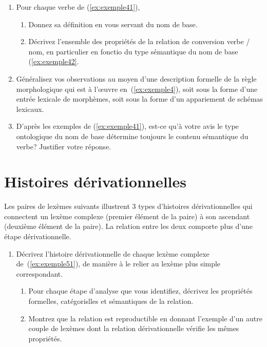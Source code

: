 \begin{enumerate}
\item Pour chaque verbe de (\ref{ex:exemple41}), 
  \begin{enumerate}
  \item Donnez sa  définition en vous servant du nom de base.
  \item Décrivez l'ensemble des propriétés de la relation de conversion  verbe / nom, en particulier en fonctio du type sémantique du nom de base (\ref{ex:exemple42}.
  \end{enumerate}   
\item Généralisez vos observations au moyen d'une description formelle de la règle morphologique qui est à l'œuvre en~(\ref{ex:exemple4}), soit sous la forme d'une entrée lexicale de morphèmes, soit sous la forme d'un appariement de schémas lexicaux.
\item D'après les exemples de (\ref{ex:exemple41}), est-ce qu'à votre avis le type ontologique du nom de base détermine toujours le contenu sémantique du verbe? Justifier votre réponse.
\end{enumerate}

\section{Histoires dérivationnelles}

Les paires de lexèmes suivants illustrent 3 types d'histoires dérivationnelles qui connectent un lexème complexe  (premier élément de la paire) à son ascendant (deuxième élément de la paire). La relation entre les deux comporte plus d'une étape dérivationnelle. 

\begin{exe}
  \ex \label{ex:exemple51}\begin{xlist}
    \ex \cogestionnaireexcinq
    \ex  \poulaillerexcinq
    \ex \langagierexcinq
  \end{xlist}
\end{exe}

\begin{enumerate}
\item \label{it:question-ex5} Décrivez l'histoire dérivationnelle de chaque lexème complexe de~(\ref{ex:exemple51}), de manière à le relier au lexème plus simple correspondant.  
  \begin{enumerate}
  \item Pour chaque étape d'analyse que vous identifiez, décrivez les propriétés formelles, catégorislles et sémantiques de la relation.
  \item Montrez que la relation est reproductible en donnant l'exemple d'un autre couple de lexèmes dont la relation dérivationnelle vérifie les mêmes propriétés.
  \end{enumerate}
\end{enumerate}

